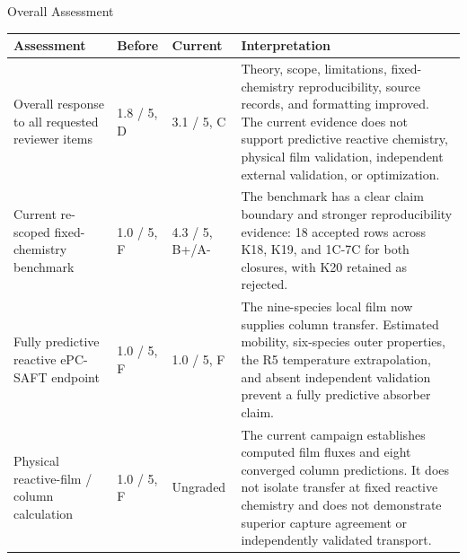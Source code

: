 \documentclass[10pt,landscape,letterpaper]{article}
\begin{document}
\newpage
{\color{navy}\Large Overall Assessment\par}
\vspace{2pt}
\small
\begin{tabularx}{\linewidth}{@{}P{2.45in}P{0.8in}P{1.0in}Y@{}}
\toprule
\textbf{Assessment} & \textbf{Before} & \textbf{Current} & \textbf{Interpretation}\\
\midrule
Overall response to all requested reviewer items & 1.8 / 5, D & 3.1 / 5, C & Theory, scope, limitations, fixed-chemistry reproducibility, source records, and formatting improved. The current evidence does not support predictive reactive chemistry, physical film validation, independent external validation, or optimization.\\[6pt]
Current re-scoped fixed-chemistry benchmark & 1.0 / 5, F & 4.3 / 5, B+/A- & The benchmark has a clear claim boundary and stronger reproducibility evidence: 18 accepted rows across K18, K19, and 1C-7C for both closures, with K20 retained as rejected.\\[6pt]
Fully predictive reactive ePC-SAFT endpoint & 1.0 / 5, F & 1.0 / 5, F & The nine-species local film now supplies column transfer. Estimated mobility, six-species outer properties, the R5 temperature extrapolation, and absent independent validation prevent a fully predictive absorber claim.\\[6pt]
Physical reactive-film / column calculation & 1.0 / 5, F & Ungraded & The current campaign establishes computed film fluxes and eight converged column predictions. It does not isolate transfer at fixed reactive chemistry and does not demonstrate superior capture agreement or independently validated transport.\\
\bottomrule
\end{tabularx}
\end{document}
